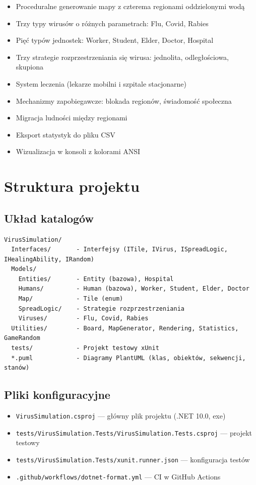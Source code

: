 \documentclass[a4paper,12pt]{article}
\begin{document}
\begin{itemize}
    \item Proceduralne generowanie mapy z czterema regionami oddzielonymi wodą
    \item Trzy typy wirusów o różnych parametrach: Flu, Covid, Rabies
    \item Pięć typów jednostek: Worker, Student, Elder, Doctor, Hospital
    \item Trzy strategie rozprzestrzeniania się wirusa: jednolita, odległościowa, skupiona
    \item System leczenia (lekarze mobilni i szpitale stacjonarne)
    \item Mechanizmy zapobiegawcze: blokada regionów, świadomość społeczna
    \item Migracja ludności między regionami
    \item Eksport statystyk do pliku CSV
    \item Wizualizacja w konsoli z kolorami ANSI
\end{itemize}

\section{Struktura projektu}

\subsection{Układ katalogów}

\begin{lstlisting}[frame=single, numbers=none, basicstyle=\ttfamily\small]
VirusSimulation/
  Interfaces/       - Interfejsy (ITile, IVirus, ISpreadLogic, IHealingAbility, IRandom)
  Models/
    Entities/       - Entity (bazowa), Hospital
    Humans/         - Human (bazowa), Worker, Student, Elder, Doctor
    Map/            - Tile (enum)
    SpreadLogic/    - Strategie rozprzestrzeniania
    Viruses/        - Flu, Covid, Rabies
  Utilities/        - Board, MapGenerator, Rendering, Statistics, GameRandom
  tests/            - Projekt testowy xUnit
  *.puml            - Diagramy PlantUML (klas, obiektów, sekwencji, stanów)
\end{lstlisting}

\subsection{Pliki konfiguracyjne}

\begin{itemize}
    \item \texttt{VirusSimulation.csproj} --- główny plik projektu (.NET 10.0, exe)
    \item \texttt{tests/VirusSimulation.Tests/VirusSimulation.Tests.csproj} --- projekt testowy
    \item \texttt{tests/VirusSimulation.Tests/xunit.runner.json} --- konfiguracja testów
    \item \texttt{.github/workflows/dotnet-format.yml} --- CI w GitHub Actions
\end{itemize}
\end{document}
